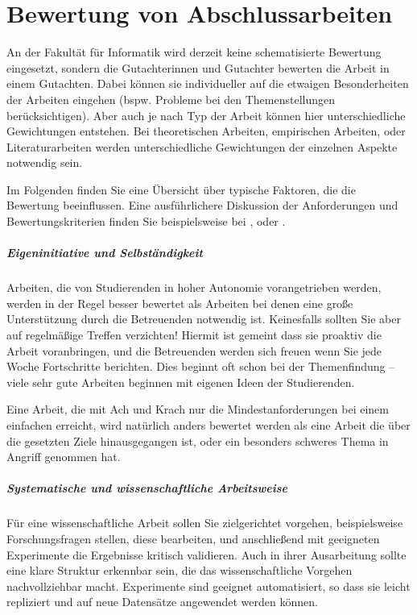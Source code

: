 \chapter{Bewertung von Abschlussarbeiten}

An der Fakultät für Informatik wird derzeit keine schematisierte Bewertung eingesetzt,
sondern die Gutachterinnen und Gutachter bewerten die Arbeit in einem Gutachten.
Dabei können sie individueller auf die etwaigen Besonderheiten der Arbeiten eingehen
(bspw.{} Probleme bei den Themenstellungen berücksichtigen).
Aber auch je nach Typ der Arbeit können hier unterschiedliche Gewichtungen entstehen.
Bei theoretischen Arbeiten, empirischen Arbeiten, oder Literaturarbeiten werden unterschiedliche
Gewichtungen der einzelnen Aspekte notwendig sein.

Im Folgenden finden Sie eine Übersicht über typische Faktoren, die die Bewertung beeinflussen.
Eine ausführlichere Diskussion der Anforderungen und Bewertungskriterien finden Sie
beispielsweise bei \textcite{Voss2022}, \textcite{Deininger2017} oder \textcite{Boles21}.

\paragraph*{Eigeninitiative und Selbständigkeit}
Arbeiten, die von Studierenden in hoher Autonomie vorangetrieben werden, werden in der Regel
besser bewertet als Arbeiten bei denen eine große Unterstützung durch die Betreuenden notwendig ist.
Keinesfalls sollten Sie aber auf regelmäßige Treffen verzichten! Hiermit ist gemeint dass sie proaktiv
die Arbeit voranbringen, und die Betreuenden werden sich freuen wenn Sie jede Woche Fortschritte berichten.
Dies beginnt oft schon bei der Themenfindung -- viele sehr gute Arbeiten beginnen mit eigenen Ideen
der Studierenden.

Eine Arbeit, die mit Ach und Krach nur die Mindestanforderungen bei einem einfachen erreicht, wird natürlich anders
bewertet werden als eine Arbeit die über die gesetzten Ziele hinausgegangen ist, oder ein besonders schweres Thema in Angriff genommen hat.

\paragraph*{Systematische und wissenschaftliche Arbeitsweise}
Für eine wissenschaftliche Arbeit sollen Sie zielgerichtet vorgehen, beispielsweise Forschungsfragen stellen,
diese bearbeiten, und anschließend mit geeigneten Experimente die Ergebnisse kritisch validieren.
Auch in ihrer Ausarbeitung sollte eine klare Struktur erkennbar sein, die das wissenschaftliche Vorgehen
nachvollziehbar macht. Experimente sind geeignet automatisiert, so dass sie leicht repliziert und auf neue
Datensätze angewendet werden können.


